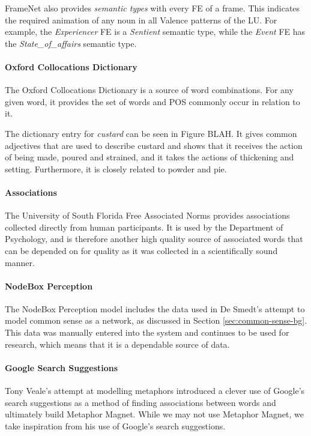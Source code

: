 FrameNet also provides \textit{semantic types} with every FE of a frame. This indicates the required animation of any noun in all Valence patterns of the LU. For example, the \textit{Experiencer} FE is a \textit{Sentient} semantic type, while the \textit{Event} FE has the \textit{State\_of\_affairs} semantic type.

\paragraph{Oxford Collocations Dictionary}
The Oxford Collocations Dictionary\cite{crowther2003oxford} is a source of word combinations. For any given word, it provides the set of words and POS commonly occur in relation to it.

The dictionary entry for \textit{custard} can be seen in Figure BLAH. It gives common adjectives that are used to describe custard and shows that it receives the action of being made, poured and strained, and it takes the actions of thickening and setting. Furthermore, it is closely related to powder and pie.


\paragraph{Associations}
The University of South Florida Free Associated Norms\cite{nelson2004university} provides associations collected directly from human participants. It is used by the Department of Psychology, and is therefore another high quality source of associated words that can be depended on for quality as it was collected in a scientifically sound manner.


\paragraph{NodeBox Perception}
The NodeBox Perception model includes the data used in De Smedt's attempt to model common sense as a network, as discussed in Section \ref{sec:common-sense-bg}. This data was manually entered into the system and continues to be used for research, which means that it is a dependable source of data. 

\paragraph{Google Search Suggestions}
Tony Veale's attempt at modelling metaphors\cite{vealespecifying} introduced a clever use of Google's search suggestions as a method of finding associations between words and ultimately build Metaphor Magnet. While we may not use Metaphor Magnet, we take inspiration from his use of Google's search suggestions.

